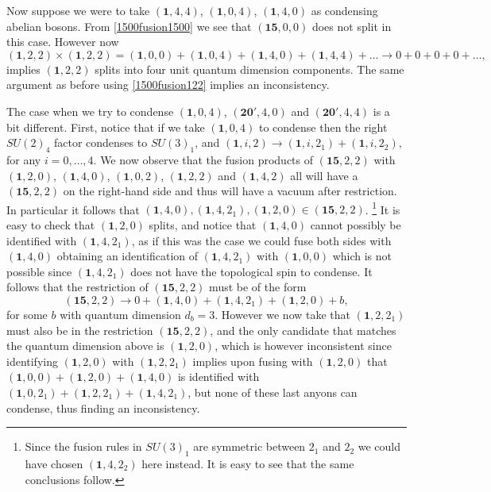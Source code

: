 \documentclass[11pt]{article}
\numberwithin{equation}{section}
\begin{document}
Now suppose we were to take $(\mathbf{1},4,4)$, $(\mathbf{1},0,4)$, $(\mathbf{1},4,0)$ as condensing abelian bosons. From \eqref{1500fusion1500} we see that $(\mathbf{15},0,0)$ does not split in this case. However now
\begin{equation}
    (\mathbf{1},2,2) \times (\mathbf{1},2,2) = (\mathbf{1},0,0) + (\mathbf{1},0,4) + (\mathbf{1},4,0) + (\mathbf{1},4,4) + \ldots \longrightarrow 0+0+0+0+\ldots,
\end{equation}
implies $(\mathbf{1},2,2)$ splits into four unit quantum dimension components. The same argument as before using \eqref{1500fusion122} implies an inconsistency.

The case when we try to condense $(\mathbf{1},0,4)$, $(\mathbf{20}',4,0)$ and $(\mathbf{20}',4,4)$ is a bit different. First, notice that if we take $(\mathbf{1},0,4)$ to condense then the right $SU(2)_{4}$ factor condenses to $SU(3)_{1}$, and $(\mathbf{1},i,2) \to (\mathbf{1},i,2_{1}) + (\mathbf{1},i,2_{2})$, for any $i=0 , \ldots , 4$. We now observe that the fusion products of $(\mathbf{15},2,2)$ with $(\mathbf{1},2,0)$, $(\mathbf{1},4,0)$, $(\mathbf{1},0,2)$, $(\mathbf{1},2,2)$ and $(\mathbf{1},4,2)$ all will have a $(\mathbf{15},2,2)$ on the right-hand side and thus will have a vacuum after restriction. In particular it follows that $(\mathbf{1},4,0), (\mathbf{1},4,2_{1}), (\mathbf{1},2,0) \in (\mathbf{15},2,2)$. \footnote{Since the fusion rules in $SU(3)_{1}$ are symmetric between $2_{1}$ and $2_{2}$ we could have chosen $(\mathbf{1},4,2_{2})$ here instead. It is easy to see that the same conclusions follow.} It is easy to check that $(\mathbf{1},2,0)$ splits, and notice that $(\mathbf{1},4,0)$ cannot possibly be identified with $(\mathbf{1},4,2_{1})$, as if this was the case we could fuse both sides with $(\mathbf{1},4,0)$ obtaining an identification of $(\mathbf{1},4,2_{1})$ with $(\mathbf{1},0,0)$ which is not possible since $(\mathbf{1},4,2_{1})$ does not have the topological spin to condense. It follows that the restriction of $(\mathbf{15},2,2)$ must be of the form
\begin{equation}
    (\mathbf{15},2,2) \longrightarrow 0 + (\mathbf{1},4,0) + (\mathbf{1},4,2_{1}) + (\mathbf{1}, 2, 0) + b,
\end{equation}
for some $b$ with quantum dimension $d_{b} = 3$. However we now take that $(\mathbf{1},2,2_{1})$ must also be in the restriction $(\mathbf{15},2,2)$, and the only candidate that matches the quantum dimension above is $(\mathbf{1}, 2, 0)$, which is however inconsistent since identifying $(\mathbf{1}, 2, 0)$ with $(\mathbf{1},2,2_{1})$ implies upon fusing with $(\mathbf{1}, 2, 0)$ that $(\mathbf{1},0,0) + (\mathbf{1},2,0) + (\mathbf{1},4,0)$ is identified with $(\mathbf{1},0,2_{1}) + (\mathbf{1},2,2_{1}) + (\mathbf{1},4,2_{1})$, but none of these last anyons can condense, thus finding an inconsistency.
\end{document}
